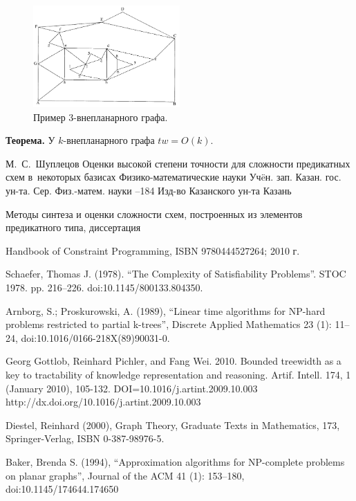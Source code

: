 \documentclass[12pt]{article}
\begin{document}
\begin{figure}[htb]
\centering
\includegraphics[width=0.50\textwidth]{outerplanar.png}
\caption{Пример 3-внепланарного графа.}
\label{fig:outerplanar_graph}
\end{figure}

\textbf{Теорема.}
У $k$-внепланарного графа $tw=O(k)$\cite{Baker94}.


\clearpage
{}
    \by М.~С.~Шуплецов
    \paper Оценки высокой степени точности для сложности предикатных схем в~некоторых базисах
    \inbook Физико-математические науки
    \serial Уч\"eн. зап. Казан. гос. ун-та. Сер. Физ.-матем. науки
    --184
    \publ Изд-во Казанского ун-та
    \publaddr Казань

Методы синтеза и оценки сложности схем, построенных из элементов предикатного типа, диссертация

 Handbook of Constraint Programming, ISBN 9780444527264; 2010 г.

 Schaefer, Thomas J. (1978). 
``The Complexity of Satisfiability Problems''. STOC 1978. pp. 216–226. doi:10.1145/800133.804350.

 Arnborg, S.; Proskurowski, A. (1989), 
``Linear time algorithms for NP-hard problems restricted to partial k-trees'',
Discrete Applied Mathematics 23 (1): 11–24, doi:10.1016/0166-218X(89)90031-0.

Georg Gottlob, Reinhard Pichler, and Fang Wei. 2010. Bounded treewidth as a key to tractability of knowledge representation and reasoning. Artif. Intell. 174, 1 (January 2010), 105-132. DOI=10.1016/j.artint.2009.10.003 http://dx.doi.org/10.1016/j.artint.2009.10.003

Diestel, Reinhard (2000), Graph Theory, Graduate Texts in Mathematics, 
173, Springer-Verlag, ISBN 0-387-98976-5.

Baker, Brenda S. (1994), 
``Approximation algorithms for NP-complete problems on planar graphs'', 
Journal of the ACM 41 (1): 153–180, doi:10.1145/174644.174650
\endthebibliography
\end{document}
